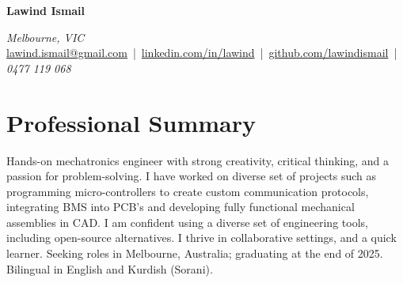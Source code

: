 \documentclass[11pt,a4paper]{article}
\begin{document}
\begin{center}
    {\Huge \bfseries Lawind Ismail}
    \vspace{5pt}
\end{center}

\begin{center}
    \textit{Melbourne, VIC} \\
    \href{mailto:lawind.ismail@gmail.com}{lawind.ismail@gmail.com} \,|\,
    \href{https://www.linkedin.com/in/lawind}{linkedin.com/in/lawind} \,|\,
    \href{https://github.com/lawindismail}{github.com/lawindismail} \,|\,
    \textit{0477 119 068}
\end{center}

\section{Professional Summary}
\justifying
Hands-on mechatronics engineer with strong creativity, critical thinking, and a passion for problem-solving. I have worked on diverse set of projects such as programming micro-controllers to create custom communication protocols, integrating BMS into PCB's and developing fully functional mechanical assemblies in CAD. I am confident using a diverse set of engineering tools, including open-source alternatives. I thrive in collaborative settings, and a quick learner. Seeking roles in Melbourne, Australia; graduating at the end of 2025. Bilingual in English and Kurdish (Sorani).

\end{document}
